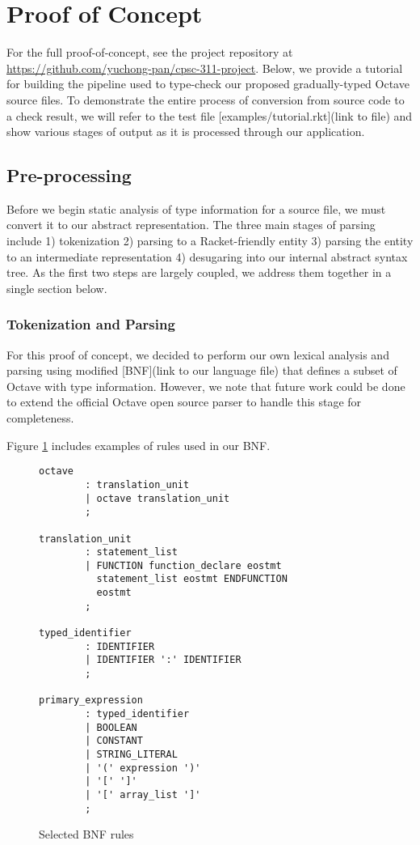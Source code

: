 \section{Proof of Concept}
For the full proof-of-concept, see the project repository at \url{https://github.com/yuchong-pan/cpsc-311-project}. Below, we provide a tutorial for building the pipeline used to type-check our proposed gradually-typed Octave source files. To demonstrate the entire process of conversion from source code to a check result, we will refer to the test file [examples/tutorial.rkt](link to file) and show various stages of output as it is processed through our application.

\subsection{Pre-processing}
Before we begin static analysis of type information for a source file, we must convert it to our abstract representation. The three main stages of parsing include 1) tokenization 2) parsing to a Racket-friendly entity 3) parsing the entity to an intermediate representation 4) desugaring into our internal abstract syntax tree. As the first two steps are largely coupled, we address them together in a single section below.

\subsubsection{Tokenization and Parsing}
For this proof of concept, we decided to perform our own lexical analysis and parsing using modified [BNF](link to our language file) that defines a subset of Octave with type information. However, we note that future work could be done to extend the official Octave open source parser \cite{johneaton2018octaveparser} to handle this stage for completeness.

Figure \ref{fig:bnf} includes examples of rules used in our BNF.

\begin{figure}[h]
    \begin{lstlisting}
octave
        : translation_unit
        | octave translation_unit
        ;

translation_unit
        : statement_list
        | FUNCTION function_declare eostmt
          statement_list eostmt ENDFUNCTION
          eostmt
        ;

typed_identifier
        : IDENTIFIER
        | IDENTIFIER ':' IDENTIFIER
        ;

primary_expression
        : typed_identifier
        | BOOLEAN
        | CONSTANT
        | STRING_LITERAL
        | '(' expression ')'
        | '[' ']'
        | '[' array_list ']'
        ;
    \end{lstlisting}
    \caption[]{Selected BNF rules}
    \label{fig:bnf}
\end{figure}

